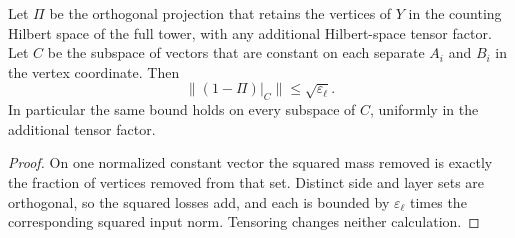 \begin{corollary}
\label{prune:constant-compression}
Let \(\Pi\) be the orthogonal projection that retains the vertices
of \(Y\) in the counting Hilbert space of the full tower, with any
additional Hilbert-space tensor factor.  Let \(C\) be the subspace
of vectors that are constant on each separate \(A_i\) and \(B_i\)
in the vertex coordinate.  Then
\[
 \|(1-\Pi)|_C\|\leq\sqrt{\varepsilon_\ell}.
\]
In particular the same bound holds on every subspace of \(C\),
uniformly in the additional tensor factor.
\end{corollary}

\begin{proof}
On one normalized constant vector the squared mass removed is exactly
the fraction of vertices removed from that set.  Distinct side and
layer sets are orthogonal, so the squared losses add, and each is
bounded by \(\varepsilon_\ell\) times the corresponding squared
input norm.  Tensoring changes neither calculation.
\end{proof}

